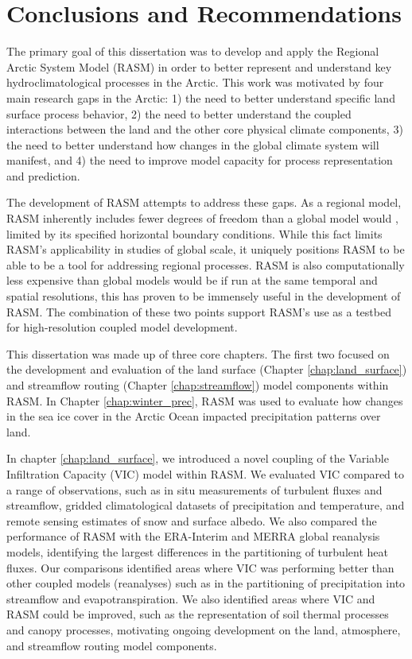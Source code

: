\chapter{Conclusions and Recommendations}
\label{chap:conclusions}

The primary goal of this dissertation was to develop and apply the Regional Arctic System Model (RASM) in order to better represent and understand key hydroclimatological processes in the Arctic.
This work was motivated by four main research gaps in the Arctic: 1) the need to better understand specific land surface process behavior, 2) the need to better understand the coupled interactions between the land and the other core physical climate components, 3) the need to better understand how changes in the global climate system will manifest, and 4) the need to improve model capacity for process representation and prediction.

The development of RASM attempts to address these gaps.
As a regional model, RASM inherently includes fewer degrees of freedom than a global model would \citep[e.g. ][]{Deser_2016}, limited by its specified horizontal boundary conditions.
While this fact limits RASM's applicability in studies of global scale, it uniquely positions RASM to be able to be a tool for addressing regional processes.
RASM is also computationally less expensive than global models would be if run at the same temporal and spatial resolutions, this has proven to be immensely useful in the development of RASM.
The combination of these two points support RASM's use as a testbed for high-resolution coupled model development.

This dissertation was made up of three core chapters.
The first two focused on the development and evaluation of the land surface (Chapter \ref{chap:land_surface}) and streamflow routing (Chapter \ref{chap:streamflow}) model components within RASM.
In Chapter \ref{chap:winter_prec}, RASM was used to evaluate how changes in the sea ice cover in the Arctic Ocean impacted precipitation patterns over land.

In chapter \ref{chap:land_surface}, we introduced a novel coupling of the Variable Infiltration Capacity (VIC) model within RASM.
We evaluated VIC compared to a range of observations, such as in situ measurements of turbulent fluxes and streamflow, gridded climatological datasets of precipitation and temperature, and remote sensing estimates of snow and surface albedo.
We also compared the performance of RASM with the ERA-Interim and MERRA global reanalysis models, identifying the largest differences in the partitioning of turbulent heat fluxes.
Our comparisons identified areas where VIC was performing better than other coupled models (reanalyses) such as in the partitioning of precipitation into streamflow and evapotranspiration.
We also identified areas where VIC and RASM could be improved, such as the representation of soil thermal processes and canopy processes, motivating ongoing development on the land, atmosphere, and streamflow routing model components.

